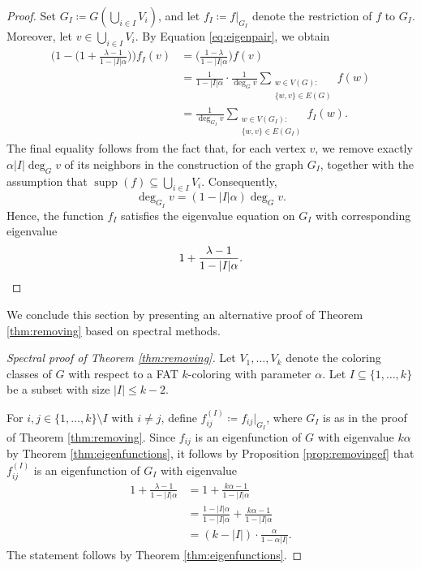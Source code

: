 \documentclass{article}
\DeclareMathOperator{\supp}{supp}
\theoremstyle{plain}
\theoremstyle{definition}
\theoremstyle{remark}
\begin{document}
\begin{proof}
    Set $G_I\coloneqq G\left(\bigcup_{i\in I}V_i\right)$, and let $f_I\coloneqq f|_{G_I}$ denote the restriction of $f$ to $G_I$. Moreover, let $v\in \bigcup_{i\in I}V_i$. By Equation \eqref{eq:eigenpair}, we obtain
    \begin{align*}
        \biggl(1-\biggl(1+\frac{\lambda-1}{1-|I|\alpha}\biggr)\biggr)f_I(v)
        &= \biggl(\frac{1-\lambda}{1-|I|\alpha}\biggr)f(v)\\
        &= \frac{1}{1-|I|\alpha}\cdot\frac{1}{\deg_G v}\sum_{\substack{w\in V(G):\\ \{w,v\}\in E(G)}} f(w)\\
        &= \frac{1}{\deg_{G_I}v}\sum_{\substack{w\in V(G_I):\\\{w,v\}\in E(G_I)}} f_I(w).
    \end{align*}
    The final equality follows from the fact that, for each vertex $v$, we remove exactly $\alpha |I| \deg_G v$ of its neighbors in the construction of the graph $G_I$, together with the assumption that $\supp(f)\subseteq \bigcup_{i\in I}V_i$. Consequently,
\[
    \deg_{G_I} v = (1 - |I|\alpha)\deg_G v.
\]
Hence, the function $f_I$ satisfies the eigenvalue equation on $G_I$ with corresponding eigenvalue
\[
    1 + \frac{\lambda - 1}{1 - |I|\alpha}.\qedhere
\]
\end{proof}

We conclude this section by presenting an alternative proof of Theorem \ref{thm:removing} based on spectral methods.

\begin{proof}[Spectral proof of Theorem \ref{thm:removing}]
    

Let $V_1,\ldots,V_k$ denote the coloring classes of $G$ with respect to a FAT $k$-coloring with parameter $\alpha$. Let $I \subseteq \{1,\ldots,k\}$ be a subset with size $\lvert I \rvert \leq k-2$.

For $i,j \in \{1,\ldots,k\} \setminus I$ with $i \neq j$, define $f_{ij}^{(I)} \coloneqq f_{ij}\rvert_{G_I}$, where $G_I$ is as in the proof of Theorem \ref{thm:removing}. Since $f_{ij}$ is an eigenfunction of $G$ with eigenvalue $k\alpha$ by Theorem \ref{thm:eigenfunctions}, it follows by Proposition \ref{prop:removingef} that $f_{ij}^{(I)}$ is an eigenfunction of $G_I$ with eigenvalue
\begin{align*}
    1 + \frac{\lambda - 1}{1 - |I|\alpha} 
    &= 1 + \frac{k\alpha - 1}{1 - |I|\alpha} \\
    &= \frac{1 - |I|\alpha}{1 - |I|\alpha} + \frac{k\alpha - 1}{1 - |I|\alpha} \\
    &= (k - |I|)\cdot \frac{\alpha}{1 - \alpha |I|}.
\end{align*}
The statement follows by Theorem \ref{thm:eigenfunctions}.
\end{proof}
\end{document}
